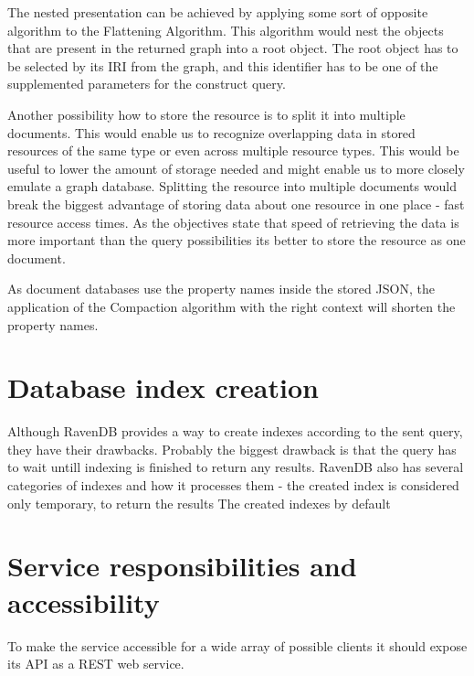 The nested presentation can be achieved by applying some sort of opposite algorithm to the Flattening Algorithm. This algorithm would nest the objects that are present in the returned graph into a root object. The root object has to be selected by its IRI from the graph, and this identifier has to be one of the supplemented parameters for the construct query.

Another possibility how to store the resource is to split it into multiple documents. This would enable us to recognize overlapping data in stored resources of the same type or even across multiple resource types. This would be useful to lower the amount of storage needed and might enable us to more closely emulate a graph database. Splitting the resource into multiple documents would break the biggest advantage of storing data about one resource in one place - fast resource access times. As the objectives state that speed of retrieving the data is more important than the query possibilities its better to store the resource as one document.


As document databases use the property names inside the stored JSON, the application of the Compaction algorithm with the right context will shorten the property names.


\section{Database index creation}
Although RavenDB provides a way to create indexes according to the sent query, they have their drawbacks. Probably the biggest drawback is that the query has to wait untill indexing is finished to return any results. RavenDB also has several categories of indexes and how it processes them - the created index is considered only temporary, to return the results The created indexes by default



\section{Service responsibilities and accessibility}
To make the service accessible for a wide array of possible clients it should expose its API as a REST web service.

